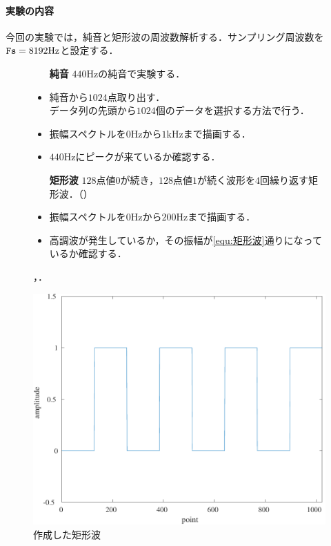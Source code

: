 \paragraph{実験の内容}今回の実験では，純音と矩形波の周波数解析する．サンプリング周波数を\(\textrm{\texttt{Fs}}=8192\textrm{Hz}\)と設定する．
\begin{figure}[H]
    \begin{minipage}[c]{.55\textwidth}
        \begin{itemize}
            \item[\textbf{純音}] \(440\textrm{Hz}\)の純音で実験する．
            \item 純音から\(1024\)点取り出す．\\
                  データ列の先頭から\(1024\)個のデータを選択する方法で行う．
            \item 振幅スペクトルを\(0\textrm{Hz}\)から\(1\textrm{kHz}\)まで描画する．
            \item \(440\textrm{Hz}\)にピークが来ているか確認する．
            \item[\textbf{矩形波}] \(128\)点値\(0\)が続き，\(128\)点値\(1\)が続く波形を\(4\)回繰り返す矩形波．（）
            \item 振幅スペクトルを\(0\textrm{Hz}\)から\(200\textrm{Hz}\)まで描画する．
            \item 高調波が発生しているか，その振幅が\eqref{equ:矩形波}通りになっているか確認する．
        \end{itemize}
        \scall{}，．
    \end{minipage}
    \begin{minipage}[c]{.4\textwidth}
        \centering
        \includegraphics[keepaspectratio,width=\textwidth]{../../Figures/02_021.pdf}
        \caption{作成した矩形波}
        \label{fig:作成した矩形波}
    \end{minipage}
\end{figure}
